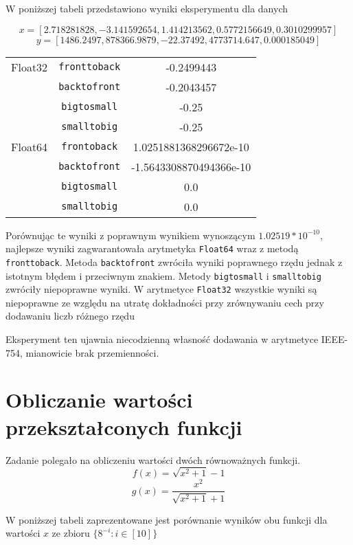 \documentclass{article}
\begin{document}
W poniższej tabeli przedstawiono wyniki eksperymentu dla danych 

$$
x = [2.718281828, -3.141592654, 1.414213562, 0.5772156649, 0.3010299957]
$$
$$
y = [1486.2497,878366.9879,-22.37492,4773714.647,0.000185049]
$$

\begin{center}
  \begin{tabular}{| c | c | c |}
    \hline
    Float32 & \texttt{fronttoback} & -0.2499443 \\
    & \texttt{backtofront} & -0.2043457 \\
    & \texttt{bigtosmall} & -0.25 \\
    & \texttt{smalltobig} & -0.25 \\
    \hline
    Float64 & \texttt{frontoback} & 1.0251881368296672e-10 \\
    & \texttt{backtofront} & -1.5643308870494366e-10 \\
    & \texttt{bigtosmall} & 0.0 \\
    & \texttt{smalltobig} & 0.0 \\
    \hline
  \end{tabular}
\end{center}

Porównując te wyniki z poprawnym wynikiem wynoszącym $1.02519*10^{-10}$, najlepsze wyniki zagwarantowała arytmetyka \texttt{Float64} wraz z metodą \texttt{fronttoback}.
Metoda \texttt{backtofront} zwróciła wyniki poprawnego rzędu jednak z istotnym błędem i przeciwnym znakiem.
Metody \texttt{bigtosmall} i \texttt{smalltobig} zwróciły niepoprawne wyniki.
W arytmetyce \texttt{Float32} wszystkie wyniki są niepoprawne ze względu na utratę dokładności przy zrównywaniu cech przy dodawaniu liczb różnego rzędu

Eksperyment ten ujawnia niecodzienną własność dodawania w arytmetyce IEEE-754, mianowicie brak przemienności.


\section{Obliczanie wartości przekształconych funkcji}

Zadanie polegało na obliczeniu wartości dwóch równoważnych funkcji.
$$
f(x) = \sqrt{x^2 + 1} - 1
$$
$$
g(x) = \frac{x^2}{\sqrt{x^2 + 1} + 1}
$$

W poniższej tabeli zaprezentowane jest porównanie wyników obu funkcji dla wartości $x$ ze zbioru $\{8^{-i} : i \in [10]\}$
\end{document}
